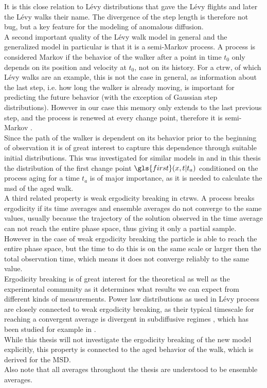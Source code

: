{
It is this close relation to L\'evy distributions that gave the L\'evy flights and later the L\'evy walks their name. The divergence of the step length is therefore not bug, but a key feature for the modeling of anomalous diffusion. \\  

A second important quality of the L\'evy walk model in general and the generalized model in particular is that it is a semi-Markov process. A process is considered Markov if the behavior of the walker after a point in time $t_0$ only depends on its position and velocity at $t_0$, not on its history. For a \gls{ctrw}, of which L\'evy walks are an example, this is not the case in general, as information about the last step, i.e. how long the walker is already moving, is important for predicting the future behavior (with the exception of Gaussian step distributions). However in our case this memory only extends to the last previous step, and the process is renewed at every change point, therefore it is semi-Markov \cite{lwreview}.
 \\
Since the path of the walker is dependent on its behavior prior to the beginning of observation it is of great interest to capture this dependence through suitable initial distributions. This was investigated for similar models in \cite{barkai2003a, barkai2003b} and in this thesis the distribution of the first change point $\gls{first}(x,t|t_a)$ conditioned on the process aging for a time $t_a$ is of major importance, as it is needed to calculate the \gls{msd} of the aged walk.\\

A third related property is weak ergodicity breaking in \gls{ctrw}s. A process breaks ergodicity if its time averages and ensemble averages do not converge to the same values, usually because the trajectory of the solution observed in the time average can not reach the entire phase space, thus giving it only a partial sample. However in the case of weak ergodicity breaking the particle is able to reach the entire phase space, but the time to do this is on the same scale or larger then the total observation time, which means it does not converge reliably to the same value. \\
Ergodicity breaking is of great interest for the theoretical as well as the experimental community as it determines what results we can expect from different kinds of measurements. Power law distributions as used in L\'evy process are closely connected to weak ergodicity breaking, as their typical timescale for reaching a convergent average is divergent in subdiffusive regimes \cite{anomalousTransport}, which has been studied for example in \cite{brokmann2003,radons2018}.\\
While this thesis will not investigate the ergodicity breaking of the new model explicitly, this property is connected to the aged behavior of the walk, which is derived for the MSD. \\
}
Also note that all averages throughout the thesis are understood to be ensemble averages.

